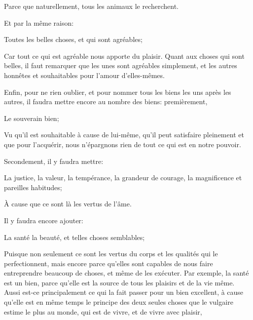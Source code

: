 Parce que naturellement, tous les animaux le recherchent.

\bigbreak

Et par la même raison:

\begin{lieu}
	Toutes les belles choses, et qui sont agréables;
\end{lieu}

Car tout ce qui est agréable nous apporte du plaisir. Quant aux choses qui sont belles, il faut remarquer que les unes sont
agréables simplement, et les autres honnêtes et souhaitables pour l'amour d'elles-mêmes. 

\bigbreak

Enfin, pour ne rien oublier, et pour nommer tous les biens les uns après les autres, il faudra mettre encore au nombre des
biens: premièrement,

\begin{lieu}
	Le souverain bien;
\end{lieu}

Vu qu'il est souhaitable à cause de lui-même, qu'il peut satisfaire pleinement et que pour l'acquérir, nous n'épargnons rien
de tout ce qui est en notre pouvoir.

\bigbreak

Secondement, il y faudra mettre:

\begin{lieu}
	La justice, la valeur, la tempérance, la grandeur de courage, la magnificence et pareilles habitudes;
\end{lieu}

À cause que ce sont là les vertus de l'âme. 

\bigbreak

Il y faudra encore ajouter:

\begin{lieu}
	La santé la beauté, et telles choses semblables;
\end{lieu}

Puisque non seulement ce sont les vertus du corps et les qualités qui le perfectionnent, mais encore parce qu'elles sont capables
de nous faire entreprendre beaucoup de choses, et même de les exécuter. Par exemple, la santé est un bien, parce qu'elle est la
source de tous les plaisirs et de la vie même. Aussi est-ce principalement ce qui la fait passer pour un bien excellent, à cause
qu'elle est en même temps le principe des deux seules choses que le vulgaire estime le plus au monde, qui est de vivre, et de vivre
avec plaisir, 

